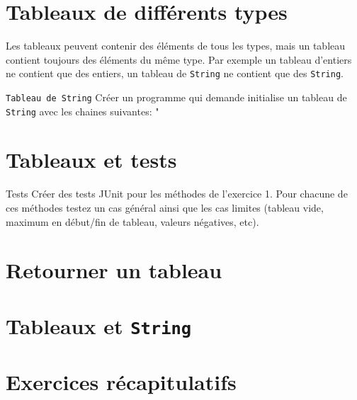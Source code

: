 \documentclass[a4paper,11pt]{article}
\begin{document}
\section{Tableaux de différents types}
	Les tableaux peuvent contenir des éléments de tous les types, 
	mais un tableau contient toujours des éléments du même type.
	Par exemple un tableau d'entiers ne contient que des entiers,
	un tableau de \texttt{String} ne contient que des \texttt{String}.

	\begin{Exercice}{\texttt{Tableau de \texttt{String}}}	
		Créer un programme qui demande initialise un tableau de \texttt{String}
		avec les chaines suivantes: "		
	\end{Exercice}
	
	

\section{Tableaux et tests}


	\begin{Exercice}{Tests}	
		Créer des tests JUnit pour les méthodes de l'exercice 1. Pour chacune 
		de ces méthodes testez un cas général ainsi que les cas limites (tableau vide,
		maximum en début/fin de tableau, valeurs négatives, etc).
	\end{Exercice}


	


\section{Retourner un tableau}

\section{Tableaux et \texttt{String}}

\section{Exercices récapitulatifs}
\end{document}
